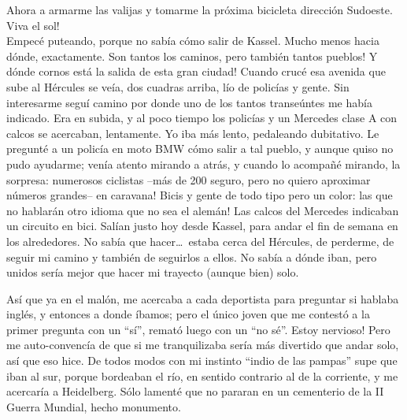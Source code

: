 Ahora a armarme las valijas y tomarme la pr\'oxima bicicleta direcci\'on
Sudoeste. \textexclamdown Viva el sol!\\

Empec\'e puteando, porque no sab\'ia c\'omo salir de Kassel. Mucho menos hacia
d\'onde, exactamente. \textexclamdown Son tantos los caminos, pero tambi\'en
tantos pueblos! \textexclamdown Y d\'onde cornos est\'a la salida de esta gran
ciudad! Cuando cruc\'e esa avenida que sube al H\'ercules se ve\'ia, dos
cuadras arriba, l\'io de polic\'ias y gente. Sin interesarme segu\'i camino
por donde uno de los tantos transe\'untes me hab\'ia indicado. Era en subida,
y al poco tiempo los polic\'ias y un Mercedes clase A con calcos se acercaban,
lentamente. Yo iba m\'as lento, pedaleando dubitativo. Le pregunt\'e a un
polic\'ia en moto {\small BMW} c\'omo salir a tal pueblo, y aunque quiso no
pudo ayudarme; ven\'ia atento mirando a atr\'as, y cuando lo acompa\~n\'e
mirando, la sorpresa: \textexclamdown numerosos ciclistas --m\'as de 200
seguro, pero no quiero aproximar n\'umeros grandes-- en caravana! Bicis y
gente de todo tipo pero un color: \textexclamdown las que no hablar\'an otro
idioma que no sea el alem\'an! Las calcos del Mercedes indicaban un circuito
en bici. Sal\'ian justo hoy desde Kassel, para andar el fin de semana en
los alrededores. No sab\'ia que hacer\ldots\ estaba cerca del H\'ercules, de
perderme, de seguir mi camino y tambi\'en de seguirlos a ellos. No sab\'ia a
d\'onde iban, pero unidos ser\'ia mejor que hacer mi trayecto (aunque bien)
solo.

As\'i que ya en el mal\'on, me acercaba a cada deportista para preguntar si
hablaba ingl\'es, y entonces a donde \'ibamos; pero el \'unico joven que me
contest\'o a la primer pregunta con un ``s\'i'', remat\'o luego con un ``no
s\'e''. \textexclamdown Estoy nervioso! Pero me auto-convenc\'ia de que si me
tranquilizaba ser\'ia m\'as divertido que andar solo, as\'i que eso hice. De
todos modos con mi instinto ``indio de las pampas'' supe que iban al sur,
porque bordeaban el r\'io, en sentido contrario al de la corriente, y me
acercar\'ia a Heidelberg. S\'olo lament\'e que no pararan en un cementerio de
la II Guerra Mundial, hecho monumento.

